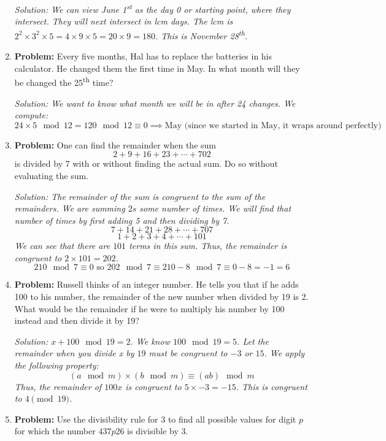 \documentclass{article}
\begin{document}
\begin{enumerate}
    \textit{Solution: We can view June 1\textsuperscript{st} as the day 0 or starting point, where they intersect. They will next intersect in lcm days. The lcm is $2^2\times3^2\times5 = 4\times9\times5 = 20\times9 = 180$. This is November 28\textsuperscript{th}.}

    \item \textbf{Problem:}
    Every five months, Hal has to replace the batteries in his calculator. He changed them the first time in May. In what month will they be changed the 25\textsuperscript{th} time?

    \textit{Solution: We want to know what month we will be in after 24 changes. We compute:
    \[
    24 \times 5 \mod 12 = 120 \mod 12 \equiv 0 \implies \text{May (since we started in May, it wraps around perfectly)}
    \]}

    \item \textbf{Problem:}
    One can find the remainder when the sum
    \[
    2 + 9 + 16 + 23 + \cdots + 702
    \]
    is divided by 7 with or without finding the actual sum. Do so without evaluating the sum.
    
    \textit{Solution: The remainder of the sum is congruent to the sum of the remainders. We are summing $2s$ some number of times. We will find that number of times by first adding 5 and then dividing by 7.
    \[
    7 + 14 + 21 + 28 + \cdots + 707
    \]
    \[
    1 + 2 + 3 + 4 + \cdots + 101
    \]
    We can see that there are $101$ terms in this sum. 
    Thus, the remainder is congruent to $2\times101 = 202$. 
    $$210 \mod 7 \equiv 0 \text{ so } 202 \mod 7 \equiv 210 - 8 \mod 7 \equiv 0 - 8 = -1 = 6$$
    }

    \item \textbf{Problem:}
    Russell thinks of an integer number. He tells you that if he adds 100 to his number, the remainder of the new number when divided by 19 is 2. What would be the remainder if he were to multiply his number by 100 instead and then divide it by 19?
    
    \textit{Solution: $x+100 \mod 19 = 2$. We know $100 \mod 19 = 5$. Let the remainder when you divide x by $19$ must be congruent to $-3$ or $15$. 
    We apply the following property:
    $$(a \mod m) \times (b \mod m) \equiv (ab) \mod m$$
    Thus, the remainder of $100x$ is congruent to $5 \times -3 = -15$. This is congruent to $4 \pmod{19}$.
   }

   \item \textbf{Problem:}
   Use the divisibility rule for 3 to find all possible values for digit \( p \) for which the number \( 437p26 \) is divisible by 3.


\end{enumerate}
\end{document}
